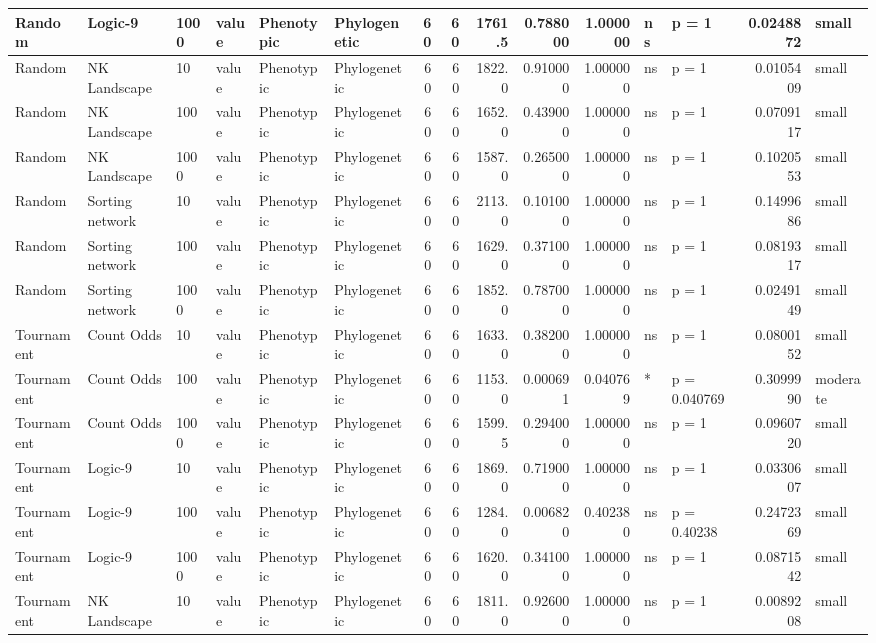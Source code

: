 \documentclass[]{book}
\begin{document}
\begin{table}
\begin{tabular}[t]{l|l|l|l|l|l|r|r|r|r|r|l|l|r|l}
\hline
Random & Logic-9 & 1000 & value & Phenotypic & Phylogenetic & 60 & 60 & 1761.5 & 0.788000 & 1.000000 & ns & p = 1 & 0.0248872 & small\\
\hline
Random & NK Landscape & 10 & value & Phenotypic & Phylogenetic & 60 & 60 & 1822.0 & 0.910000 & 1.000000 & ns & p = 1 & 0.0105409 & small\\
\hline
Random & NK Landscape & 100 & value & Phenotypic & Phylogenetic & 60 & 60 & 1652.0 & 0.439000 & 1.000000 & ns & p = 1 & 0.0709117 & small\\
\hline
Random & NK Landscape & 1000 & value & Phenotypic & Phylogenetic & 60 & 60 & 1587.0 & 0.265000 & 1.000000 & ns & p = 1 & 0.1020553 & small\\
\hline
Random & Sorting network & 10 & value & Phenotypic & Phylogenetic & 60 & 60 & 2113.0 & 0.101000 & 1.000000 & ns & p = 1 & 0.1499686 & small\\
\hline
Random & Sorting network & 100 & value & Phenotypic & Phylogenetic & 60 & 60 & 1629.0 & 0.371000 & 1.000000 & ns & p = 1 & 0.0819317 & small\\
\hline
Random & Sorting network & 1000 & value & Phenotypic & Phylogenetic & 60 & 60 & 1852.0 & 0.787000 & 1.000000 & ns & p = 1 & 0.0249149 & small\\
\hline
Tournament & Count Odds & 10 & value & Phenotypic & Phylogenetic & 60 & 60 & 1633.0 & 0.382000 & 1.000000 & ns & p = 1 & 0.0800152 & small\\
\hline
Tournament & Count Odds & 100 & value & Phenotypic & Phylogenetic & 60 & 60 & 1153.0 & 0.000691 & 0.040769 & * & p = 0.040769 & 0.3099990 & moderate\\
\hline
Tournament & Count Odds & 1000 & value & Phenotypic & Phylogenetic & 60 & 60 & 1599.5 & 0.294000 & 1.000000 & ns & p = 1 & 0.0960720 & small\\
\hline
Tournament & Logic-9 & 10 & value & Phenotypic & Phylogenetic & 60 & 60 & 1869.0 & 0.719000 & 1.000000 & ns & p = 1 & 0.0330607 & small\\
\hline
Tournament & Logic-9 & 100 & value & Phenotypic & Phylogenetic & 60 & 60 & 1284.0 & 0.006820 & 0.402380 & ns & p = 0.40238 & 0.2472369 & small\\
\hline
Tournament & Logic-9 & 1000 & value & Phenotypic & Phylogenetic & 60 & 60 & 1620.0 & 0.341000 & 1.000000 & ns & p = 1 & 0.0871542 & small\\
\hline
Tournament & NK Landscape & 10 & value & Phenotypic & Phylogenetic & 60 & 60 & 1811.0 & 0.926000 & 1.000000 & ns & p = 1 & 0.0089208 & small\\

\end{tabular}
\end{table}
\end{document}
